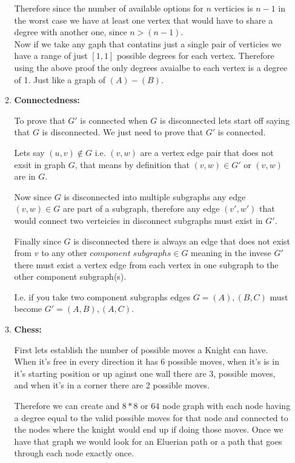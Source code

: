 \documentclass{article}
\begin{document}
\begin{enumerate}
\begin{enumerate}
        Therefore since the number of available options for $n$ verticies is $n - 1$ in the worst case we have at least one vertex that would have to share a degree with another one, since $n > (n - 1)$. \\
    
        Now if we take any gaph that contatins just a single pair of verticies we have a range of just $[1,1]$ possible degrees for each vertex. Therefore using the above proof the only degrees avaialbe to each vertex is a degree of 1. Just like a graph of $(A)-(B)$.

        \item \textbf{Connectedness:}
        
        To prove that $G'$ is connected when $G$ is disconnected lets start off saying that $G$ is disconnected. We just need to prove that $G'$ is connected.

        Lets say $(u, v) \notin G$ i.e. $(v, w)$ are a vertex edge pair that does not exsit in graph $G$, that means by definition that $(v, w) \in G'$ or $(v, w)$ are in $G$.

        Now since $G$ is disconnected into multiple subgraphs any edge $(v, w) \in G$ are part of a subgraph, therefore any edge $(v',w')$ that would connect two verteicies in disconnect subgraphs must exist in $G'$.

        Finally since $G$ is disconnected there is always an edge that does not exist from $v$ to any other $component\;subgraphs \in G$ meaning in the invese $G'$ there must exist a vertex edge from each vertex in one subgraph to the other component subgraph(s).

        I.e. if you take two component subgraphs edges $G = {(A)}, {(B,C)}$ must become $G' = {(A,B),(A,C)}$.

        \item \textbf{Chess:}
        
        First lets establish the number of possible moves a Knight can have. When it's free in every direction it has 6 possible moves, when it's is in it's starting position or up aginst one wall there are 3, possible moves, and when it's in a corner there are 2 possible moves.

        Therefore we can create and $8*8$ or $64$ node graph with each node having a degree equal to the valid possible moves for that node and connected to the nodes where the knight would end up if doing those moves. Once we have that graph we would look for an Eluerian path or a path that goes through each node exactly once.


\end{enumerate}
\end{enumerate}
\end{document}
